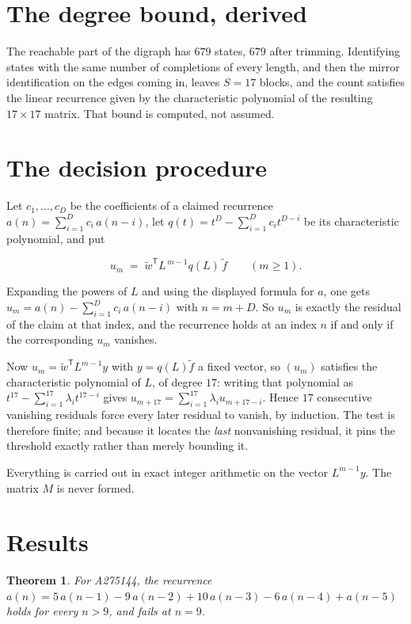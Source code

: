 \documentclass[11pt]{article}
\newtheorem{theorem}{Theorem}
\theoremstyle{definition}
\begin{document}
\section{The degree bound, derived}

The reachable part of the digraph has $679$ states, $679$ after trimming. Identifying states with the same number of completions of every length, and then the mirror identification on the edges coming in, leaves $S = 17$ blocks, and the count satisfies the linear recurrence given by the characteristic polynomial of the resulting $17\times17$ matrix. That bound is computed, not assumed.

\section{The decision procedure}

Let $c_1,\dots,c_D$ be the coefficients of a claimed recurrence $a(n) = \sum_{i=1}^{D} c_i\,a(n-i)$, let $q(t) = t^{D} - \sum_{i=1}^{D} c_i t^{D-i}$ be its characteristic polynomial, and put

\[u_m \;=\; \tilde w^{\mathsf T} L^{\,m-1} q(L)\,\tilde f \qquad (m \ge 1).\]

Expanding the powers of $L$ and using the displayed formula for $a$, one gets $u_m = a(n) - \sum_{i=1}^{D} c_i\,a(n-i)$ with $n = m + D$. So $u_m$ is exactly the residual of the claim at that index, and the recurrence holds at an index $n$ if and only if the corresponding $u_m$ vanishes.

Now $u_m = \tilde w^{\mathsf T} L^{m-1} y$ with $y = q(L)\tilde f$ a fixed vector, so $(u_m)$ satisfies the characteristic polynomial of $L$, of degree $17$: writing that polynomial as $t^{17} - \sum_{i=1}^{17} \lambda_i t^{17-i}$ gives $u_{m+17} = \sum_{i=1}^{17} \lambda_i u_{m+17-i}$. Hence $17$ consecutive vanishing residuals force every later residual to vanish, by induction. The test is therefore finite; and because it locates the {\itshape last} nonvanishing residual, it pins the threshold exactly rather than merely bounding it.

Everything is carried out in exact integer arithmetic on the vector $L^{m-1}y$. The matrix $M$ is never formed.

\section{Results}

\begin{theorem} For A275144, the recurrence $a(n) = 5\,a(n-1) - 9\,a(n-2) + 10\,a(n-3) - 6\,a(n-4) + a(n-5)$ holds for every $n > 9$, and fails at $n = 9$.\end{theorem}
\end{document}
